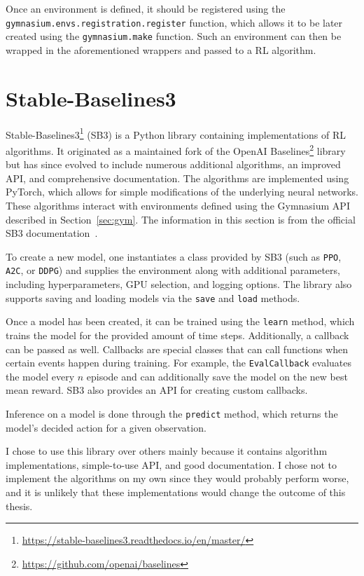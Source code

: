 \documentclass[
  digital,     %
  oneside,     %
  nosansbold,  %
  nocolorbold, %
  lof,         %
  lot,         %
]{fithesis4}
\begin{document}
Once an environment is defined, it should be registered using the \texttt{gymnasium.envs.registration.register} function, which allows it to be later created using the \texttt{gymnasium.make} function. Such an environment can then be wrapped in the aforementioned wrappers and passed to a RL algorithm.

\section{Stable-Baselines3}
Stable-Baselines3\footnote{\url{https://stable-baselines3.readthedocs.io/en/master/}} (SB3) is a Python library containing implementations of RL algorithms. It originated as a maintained fork of the OpenAI Baselines\footnote{\url{https://github.com/openai/baselines}} library but has since evolved to include numerous additional algorithms, an improved API, and comprehensive documentation. The algorithms are implemented using PyTorch, which allows for simple modifications of the underlying neural networks. These algorithms interact with environments defined using the Gymnasium API described in Section~\ref{sec:gym}. The information in this section is from the official SB3 documentation~\cite{SB3-docs}.

To create a new model, one instantiates a class provided by SB3 (such as \texttt{PPO}, \texttt{A2C}, or \texttt{DDPG}) and supplies the environment along with additional parameters, including hyperparameters, GPU selection, and logging options. The library also supports saving and loading models via the \texttt{save} and \texttt{load} methods.

Once a model has been created, it can be trained using the \texttt{learn} method, which trains the model for the provided amount of time steps. Additionally, a callback can be passed as well. Callbacks are special classes that can call functions when certain events happen during training. For example, the \texttt{EvalCallback} evaluates the model every $n$ episode and can additionally save the model on the new best mean reward. SB3 also provides an API for creating custom callbacks.

Inference on a model is done through the \texttt{predict} method, which returns the model's decided action for a given observation.

I chose to use this library over others mainly because it contains algorithm implementations, simple-to-use API, and good documentation. I chose not to implement the algorithms on my own since they would probably perform worse, and it is unlikely that these implementations would change the outcome of this thesis.
\end{document}
